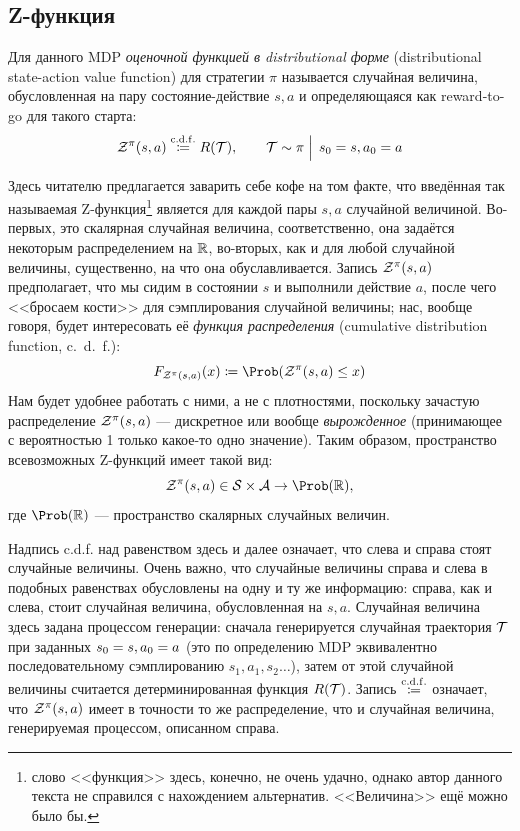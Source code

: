 \subsection{Z-функция}

\begin{definition} 
Для данного MDP \emph{оценочной функцией в distributional форме} (distributional state-action value function) для стратегии $\pi$ называется случайная величина, обусловленная на пару состояние-действие $s, a$ и определяющаяся как reward-to-go для такого старта:
$$\mathcal{Z}^\pi(s, a) \mathrel{\stackrel{\mathrm{c.d.f.}}\coloneqq} R(\mathcal{T}), \qquad \mathcal{T} \sim \pi \mathrel{\Big|} \, s_0 = s, a_0 = a $$
\end{definition}

Здесь читателю предлагается заварить себе кофе на том факте, что введённая так называемая Z-функция\footnote{слово <<функция>> здесь, конечно, не очень удачно, однако автор данного текста не справился с нахождением альтернатив. <<Величина>> ещё можно было бы.} является для каждой пары $s, a$ случайной величиной. Во-первых, это скалярная случайная величина, соответственно, она задаётся некоторым распределением на $\mathbb{R}$, во-вторых, как и для любой случайной величины, существенно, на что она обуславливается. Запись $\mathcal{Z}^\pi(s, a)$ предполагает, что мы сидим в состоянии $s$ и выполнили действие $a$, после чего <<бросаем кости>> для сэмплирования случайной величины; нас, вообще говоря, будет интересовать её \emph{функция распределения} (cumulative distribution function, c.~d.~f.):
$$F_{\Z^\pi(s, a)}(x) \coloneqq \Prob (\Z^\pi(s, a) \le x)$$
Нам будет удобнее работать с ними, а не с плотностями, поскольку зачастую распределение $\mathcal{Z}^\pi(s, a)$ --- дискретное или вообще \emph{вырожденное} (принимающее с вероятностью 1 только какое-то одно значение). Таким образом, пространство всевозможных Z-функций имеет такой вид:
\begin{equation}\label{Zfunctionspace}
\Z^\pi(s, a) \in \St \times \A \to \Prob (\R),
\end{equation}
где $\Prob (\R)$ --- пространство скалярных случайных величин. 

Надпись c.d.f. над равенством здесь и далее означает, что слева и справа стоят случайные величины. Очень важно, что случайные величины справа и слева в подобных равенствах обусловлены на одну и ту же информацию: справа, как и слева, стоит случайная величина, обусловленная на $s, a$. Случайная величина здесь задана процессом генерации: сначала генерируется случайная траектория $\mathcal{T}$ при заданных $s_0 \HM= s, a_0 \HM= a$ (это по определению MDP эквивалентно последовательному сэмплированию $s_1, a_1, s_2 \dots$), затем от этой случайной величины считается детерминированная функция $R(\mathcal{T})$. Запись $\mathrel{\stackrel{\mathrm{c.d.f.}}\coloneqq}$ означает, что $\mathcal{Z}^\pi(s, a)$ имеет в точности то же распределение, что и случайная величина, генерируемая процессом, описанном справа.

